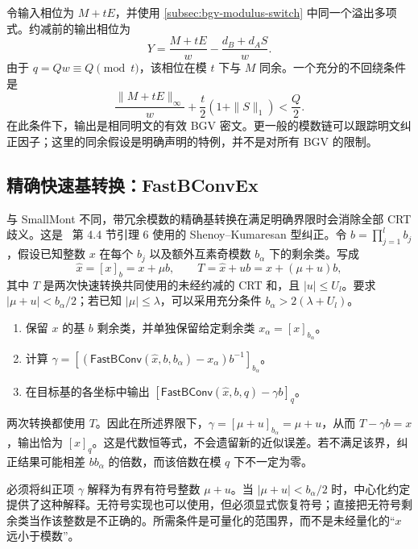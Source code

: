 令输入相位为 $M+tE$，并使用 \autoref{subsec:bgv-modulus-switch} 中同一个溢出多项式。约减前的输出相位为
\[
Y=\frac{M+tE}{w}-\frac{d_B+d_AS}{w}.
\]
由于 $q=Qw\equiv Q\pmod t$，该相位在模 $t$ 下与 $M$ 同余。一个充分的不回绕条件是
\[
\frac{\|M+tE\|_\infty}{w}+\frac{t}{2}(1+\|S\|_1)<\frac Q2.
\]
在此条件下，输出是相同明文的有效 BGV 密文。更一般的模数链可以跟踪明文纠正因子；这里的同余假设是明确声明的特例，并不是对所有 BGV 的限制。


\subsection{精确快速基转换：\textsf{FastBConvEx}}
\label{subsec:rns-fastbconvex}

与 \textsf{SmallMont} 不同，带冗余模数的精确基转换在满足明确界限时会消除全部 CRT 歧义。这是~\cite{rns-bfv} 第 4.4 节引理 6 使用的 Shenoy--Kumaresan 型纠正。令 $b=\prod_{j=1}^lb_j$，假设已知整数 $x$ 在每个 $b_j$ 以及额外互素奇模数 $b_\alpha$ 下的剩余类。写成
\[
\widehat x=[x]_b=x+\mu b,\qquad
T=\widehat x+ub=x+(\mu+u)b,
\]
其中 $T$ 是两次快速转换共同使用的未经约减的 CRT 和，且 $|u|\leq U_l$。要求 $|\mu+u|<b_\alpha/2$；若已知 $|\mu|\leq\lambda$，可以采用充分条件 $b_\alpha>2(\lambda+U_l)$。

\begin{tcolorbox}[title={\textbf{\tboxlabel{\ref*{subsec:rns-fastbconvex}} 精确快速基转换：\textsf{FastBConvEx}}}]
\begin{enumerate}
\item 保留 $x$ 的基 $b$ 剩余类，并单独保留给定剩余类 $x_\alpha=[x]_{b_\alpha}$。
\item 计算 $\gamma=[(\textsf{FastBConv}(\widehat x,b,b_\alpha)-x_\alpha)b^{-1}]_{b_\alpha}$。
\item 在目标基的各坐标中输出 $[\textsf{FastBConv}(\widehat x,b,q)-\gamma b]_q$。
\end{enumerate}
\end{tcolorbox}

\begin{myproof}
两次转换都使用 $T$。因此在所述界限下，$\gamma=[\mu+u]_{b_\alpha}=\mu+u$，从而 $T-\gamma b=x$，输出恰为 $[x]_q$。这是代数恒等式，不会遗留新的近似误差。若不满足该界，纠正结果可能相差 $bb_\alpha$ 的倍数，而该倍数在模 $q$ 下不一定为零。
\end{myproof}

 必须将纠正项 $\gamma$ 解释为有界有符号整数 $\mu+u$。当 $|\mu+u|<b_\alpha/2$ 时，中心化约定提供了这种解释。无符号实现也可以使用，但必须显式恢复符号；直接把无符号剩余类当作该整数是不正确的。所需条件是可量化的范围界，而不是未经量化的“$x$ 远小于模数”。


